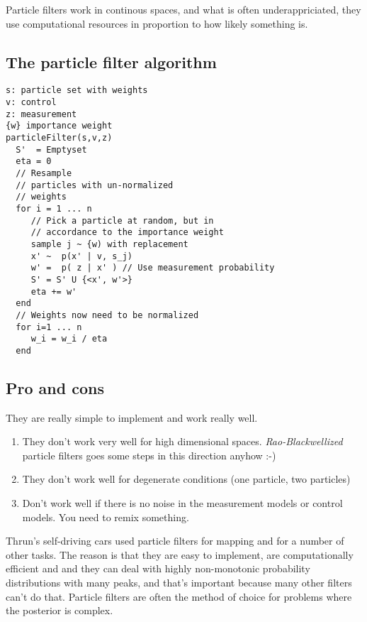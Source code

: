 \documentclass[a4, 12pt, english, USenglish]{scrreprt}
\newcommand{\idx}[1]{{\em #1}\index{#1}}
\begin{document}
Particle filters work in continous spaces, and what is often
underappriciated, they use computational resources in proportion to
how likely something is.  

\subsection{The particle filter algorithm}

\begin{verbatim}
s: particle set with weights
v: control
z: measurement
{w} importance weight 
particleFilter(s,v,z) 
  S'  = Emptyset
  eta = 0
  // Resample 
  // particles with un-normalized
  // weights
  for i = 1 ... n
     // Pick a particle at random, but in
     // accordance to the importance weight
     sample j ~ {w) with replacement 
     x' ~  p(x' | v, s_j)
     w' =  p( z | x' ) // Use measurement probability
     S' = S' U {<x', w'>}
     eta += w'
  end
  // Weights now need to be normalized
  for i=1 ... n
     w_i = w_i / eta
  end
\end{verbatim}


\subsection{Pro and cons}

They are really simple to implement and work really well.

\begin{enumerate}

\item They don't work very well for high dimensional spaces.
\idx{Rao-Blackwellized} particle filters goes some steps in this
direction anyhow :-) 

\item They don't work well for degenerate conditions (one particle,
  two particles)

\item Don't work well if there is no noise in the measurement models
  or control models.  You need to remix something.  

\end{enumerate}

Thrun's self-driving cars used particle filters for mapping and for a
number of other tasks.  The reason is that they are easy to implement,
are computationally efficient and and they can deal with highly
non-monotonic probability distributions with many peaks, and that's
important because many other filters can't do that.   Particle filters
are often the method of choice for problems where the posterior is
complex.
\end{document}
